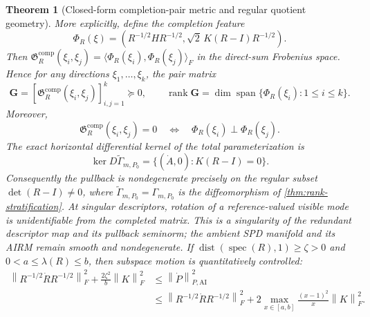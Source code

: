 \documentclass[10pt]{article}
\theoremstyle{plain}
\newtheorem{theorem}{Theorem}[section]
\theoremstyle{definition}
\theoremstyle{remark}
\newcommand{\AI}{\mathrm{AI}}
\newcommand{\rank}{\operatorname{rank}}
\newcommand{\fro}[1]{\left\lVert #1\right\rVert_F}
\newcommand{\norm}[1]{\left\lVert #1\right\rVert}
\begin{document}
\begin{theorem}[Closed-form completion-pair metric and regular quotient geometry]
More explicitly, define the completion feature
\begin{equation}
  \Phi_R(\xi)
  =
  \left(
  R^{-1/2}HR^{-1/2},
  \sqrt{2}\,K(R-I)R^{-1/2}
  \right).
  \label{eq:completion-feature}
\end{equation}
Then
\(
\mathfrak G_R^{\mathrm{comp}}(\xi_i,\xi_j)
=\langle\Phi_R(\xi_i),\Phi_R(\xi_j)\rangle_F
\)
in the direct-sum Frobenius space.  Hence for any directions
\(\xi_1,\ldots,\xi_k\), the pair matrix
\begin{equation}
  \mathbf G
  =\left[\mathfrak G_R^{\mathrm{comp}}(\xi_i,\xi_j)\right]_{i,j=1}^k
  \succeq0,
  \qquad
  \rank\mathbf G
  =\dim\operatorname{span}\{\Phi_R(\xi_i):1\le i\le k\}.
  \label{eq:completion-gram-rank}
\end{equation}
Moreover,
\begin{equation}
  \mathfrak G_R^{\mathrm{comp}}(\xi_i,\xi_j)=0
  \quad\Longleftrightarrow\quad
  \Phi_R(\xi_i)\perp\Phi_R(\xi_j).
  \label{eq:completion-pair-orthogonality}
\end{equation}
The exact horizontal differential kernel of the total parameterization is
\begin{equation}
  \ker D\widetilde\Gamma_{m,P_0}
  =\{(\dot A,0):K(R-I)=0\}.
  \label{eq:stratified-kernel}
\end{equation}
Consequently the pullback is nondegenerate precisely on the regular subset
\(\det(R-I)\ne0\), where
\(\widetilde\Gamma_{m,P_0}=\Gamma_{m,P_0}\) is the diffeomorphism of
\cref{thm:rank-stratification}.  At singular descriptors, rotation of a
reference-valued visible mode is unidentifiable from the completed matrix.
This is a singularity of the redundant descriptor map and its pullback
seminorm; the ambient SPD manifold and its AIRM remain smooth and
nondegenerate.
If
\(\operatorname{dist}(\operatorname{spec}(R),1)\ge\zeta>0\) and
\(0<a\le\lambda(R)\le b\), then subspace motion is quantitatively controlled:
\begin{align}
  \fro{R^{-1/2}\dot R R^{-1/2}}^2
  +\frac{2\zeta^2}{b}\fro K^2
  &\le \norm{\dot P}_{P,\AI}^2
  \nonumber\\
  &\le
  \fro{R^{-1/2}\dot R R^{-1/2}}^2
  +2\max_{x\in[a,b]}\frac{(x-1)^2}{x}\fro K^2.
  \label{eq:stratified-conditioning}
\end{align}
\end{theorem}
\end{document}

